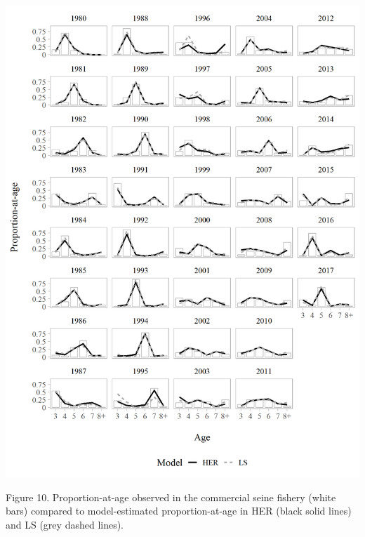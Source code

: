 \documentclass[]{article}
\begin{document}
\includegraphics[width=1\linewidth]{../../HER/figs/compare_catchcomp_barplot}

Figure 10. Proportion-at-age observed in the commercial seine fishery
(white bars) compared to model-estimated proportion-at-age in HER (black
solid lines) and LS (grey dashed lines).
\end{document}
